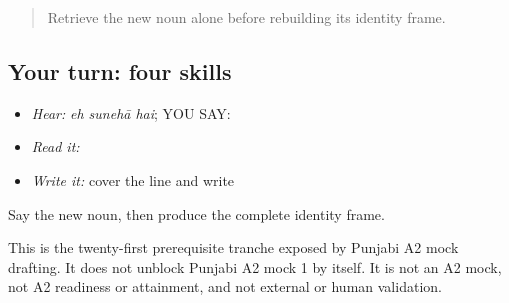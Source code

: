 \label{lesson:PA-C198-payoff}



\begin{quote}
Retrieve the new noun alone before rebuilding its identity frame.
\end{quote}

\subsection*{Your turn: four skills}
\begin{itemize}
\raggedright
  \item \emph{Hear:} \emph{eh sunehā hai}; YOU SAY: \textbf{  }
  \item \emph{Read it:} \textbf{  }
  \item \emph{Write it:} cover the line and write \textbf{  }
\end{itemize}

\begin{tcolorbox}[breakable,colback=teal!4,colframe=teal!35!black,title={Before you move on}]
Say the new noun, then produce the complete identity frame.

This is the twenty-first prerequisite tranche exposed by Punjabi A2 mock drafting. It does not unblock Punjabi A2 mock 1 by itself. It is not an A2 mock, not A2 readiness or attainment, and not external or human validation.
\end{tcolorbox}
